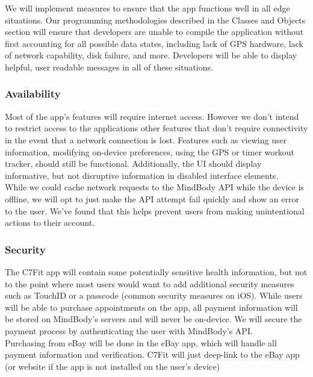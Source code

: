 \documentclass[letterpaper,10pt,titlepage]{article}
\begin{document}
We will implement measures to ensure that the app functions well in all edge situations. Our programming methodologies described in the Classes and Objects section will ensure that developers are unable to compile the application without first accounting for all possible data states, including lack of GPS hardware, lack of network capability, disk failure, and more. Developers will be able to display helpful, user readable messages in all of these situations.

\subsubsection{Availability}

Most of the app's features will require internet access. However we don't intend to restrict access to the applications other features that don't require connectivity in the event that a network connection is lost. Features such as viewing user information, modifying on-device preferences, using the GPS or timer workout tracker, should still be functional. Additionally, the UI should display informative, but not disruptive information in disabled interface elements.\\

While we could cache network requests to the MindBody API while the device is offline, we will opt to just make the API attempt fail quickly and show an error to the user. We've found that this helps prevent users from making unintentional actions to their account.

\subsubsection{Security}

The C7Fit app will contain some potentially sensitive health information, but not to the point where most users would want to add additional security measures such as TouchID or a passcode (common security measures on iOS). While users will be able to purchase appointments on the app, all payment information will be stored on MindBody's servers and will never be on-device. We will secure the payment process by authenticating the user with MindBody's API.\\

Purchasing from eBay will be done in the eBay app, which will handle all payment information and verification. C7Fit will just deep-link to the eBay app (or website if the app is not installed on the user's device)
\end{document}
